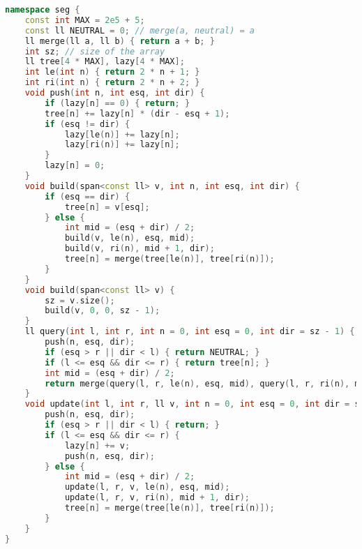 \documentclass[11pt, a4paper, twoside]{book}
\begin{document}
\begin{lstlisting}[language=C++]
namespace seg {
    const int MAX = 2e5 + 5;
    const ll NEUTRAL = 0; // merge(a, neutral) = a
    ll merge(ll a, ll b) { return a + b; }
    int sz; // size of the array
    ll tree[4 * MAX], lazy[4 * MAX];
    int le(int n) { return 2 * n + 1; }
    int ri(int n) { return 2 * n + 2; }
    void push(int n, int esq, int dir) {
        if (lazy[n] == 0) { return; }
        tree[n] += lazy[n] * (dir - esq + 1);
        if (esq != dir) {
            lazy[le(n)] += lazy[n];
            lazy[ri(n)] += lazy[n];
        }
        lazy[n] = 0;
    }
    void build(span<const ll> v, int n, int esq, int dir) {
        if (esq == dir) {
            tree[n] = v[esq];
        } else {
            int mid = (esq + dir) / 2;
            build(v, le(n), esq, mid);
            build(v, ri(n), mid + 1, dir);
            tree[n] = merge(tree[le(n)], tree[ri(n)]);
        }
    }
    void build(span<const ll> v) {
        sz = v.size();
        build(v, 0, 0, sz - 1);
    }
    ll query(int l, int r, int n = 0, int esq = 0, int dir = sz - 1) {
        push(n, esq, dir);
        if (esq > r || dir < l) { return NEUTRAL; }
        if (l <= esq && dir <= r) { return tree[n]; }
        int mid = (esq + dir) / 2;
        return merge(query(l, r, le(n), esq, mid), query(l, r, ri(n), mid + 1, dir));
    }
    void update(int l, int r, ll v, int n = 0, int esq = 0, int dir = sz - 1) {
        push(n, esq, dir);
        if (esq > r || dir < l) { return; }
        if (l <= esq && dir <= r) {
            lazy[n] += v;
            push(n, esq, dir);
        } else {
            int mid = (esq + dir) / 2;
            update(l, r, v, le(n), esq, mid);
            update(l, r, v, ri(n), mid + 1, dir);
            tree[n] = merge(tree[le(n)], tree[ri(n)]);
        }
    }
}
\end{lstlisting}

\hfill
\end{document}
